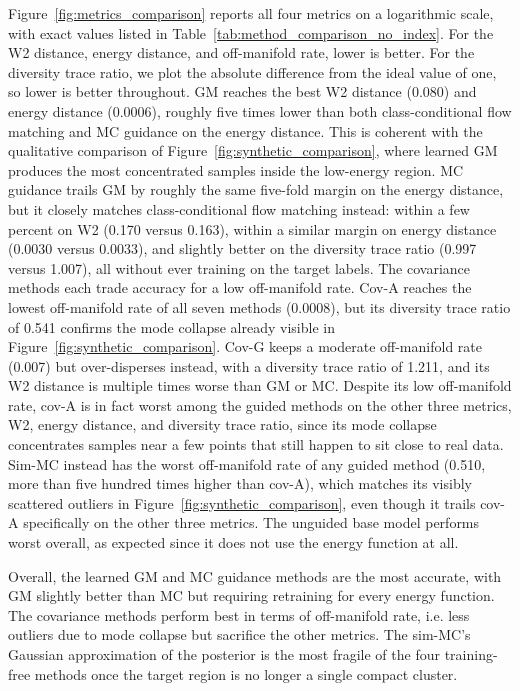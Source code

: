 \documentclass{article}
\begin{document}
Figure~\ref{fig:metrics_comparison} reports all four metrics on a logarithmic scale, with exact values listed in Table~\ref{tab:method_comparison_no_index}.
For the W2 distance, energy distance, and off-manifold rate, lower is better. For the diversity trace ratio, we plot the absolute difference from the ideal value of one, so lower is better throughout.
GM reaches the best W2 distance (0.080) and energy distance (0.0006), roughly five times lower than both class-conditional flow matching and MC guidance on the energy distance.
This is coherent with the qualitative comparison of Figure~\ref{fig:synthetic_comparison}, where learned GM produces the most concentrated samples inside the low-energy region.
MC guidance trails GM by roughly the same five-fold margin on the energy distance, but it closely matches class-conditional flow matching instead: within a few percent on W2 (0.170 versus 0.163), within a similar margin on energy distance (0.0030 versus 0.0033), and slightly better on the diversity trace ratio (0.997 versus 1.007), all without ever training on the target labels.
The covariance methods each trade accuracy for a low off-manifold rate.
Cov-A reaches the lowest off-manifold rate of all seven methods (0.0008), but its diversity trace ratio of 0.541 confirms the mode collapse already visible in Figure~\ref{fig:synthetic_comparison}.
Cov-G keeps a moderate off-manifold rate (0.007) but over-disperses instead, with a diversity trace ratio of 1.211, and its W2 distance is multiple times worse than GM or MC.
Despite its low off-manifold rate, cov-A is in fact worst among the guided methods on the other three metrics, W2, energy distance, and diversity trace ratio, since its mode collapse concentrates samples near a few points that still happen to sit close to real data.
Sim-MC instead has the worst off-manifold rate of any guided method (0.510, more than five hundred times higher than cov-A), which matches its visibly scattered outliers in Figure~\ref{fig:synthetic_comparison}, even though it trails cov-A specifically on the other three metrics.
The unguided base model performs worst overall, as expected since it does not use the energy function at all.

Overall, the learned GM and MC guidance methods are the most accurate, with GM slightly better than MC but requiring retraining for every energy function. 
The covariance methods perform best in terms of off-manifold rate, i.e. less outliers due to mode collapse but sacrifice the other metrics. 
The sim-MC's Gaussian approximation of the posterior is the most fragile of the four training-free methods once the target region is no longer a single compact cluster.
\end{document}
